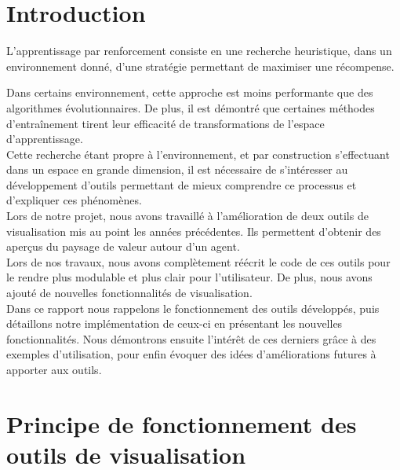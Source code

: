 \documentclass[12pt]{article}
\begin{document}
\newpage																		

\setlength{\parindent}{2ex}

\section*{Introduction}

L’apprentissage par renforcement consiste en une recherche heuristique, dans un environnement donné, d’une stratégie permettant de maximiser une récompense. \par

Dans certains environnement, cette approche est moins performante que des algorithmes évolutionnaires. De plus, il est démontré que certaines méthodes d’entraînement tirent leur efficacité de transformations de l’espace d’apprentissage. \\

Cette recherche étant propre à l’environnement, et par construction s’effectuant dans un espace en grande dimension, il est nécessaire de s’intéresser au développement d’outils permettant de mieux comprendre ce processus et d’expliquer ces phénomènes. \\

Lors de notre projet, nous avons travaillé à l’amélioration de deux outils de visualisation mis au point les années précédentes. Ils permettent d’obtenir des aperçus du paysage de valeur autour d’un agent. \\

Lors de nos travaux, nous avons complètement réécrit le code de ces outils pour le rendre plus modulable et plus clair pour l’utilisateur. De plus, nous avons ajouté de nouvelles fonctionnalités de visualisation. \\

Dans ce rapport nous rappelons le fonctionnement des outils développés, puis détaillons notre implémentation de ceux-ci en présentant les nouvelles fonctionnalités. Nous démontrons ensuite l'intérêt de ces derniers grâce à des exemples d'utilisation, pour enfin évoquer des idées d'améliorations futures à apporter aux outils. \\

\newpage

\renewcommand*\contentsname{Table des Matières}
\tableofcontents 

\newpage
\section{Principe de fonctionnement des outils de visualisation}
\end{document}
